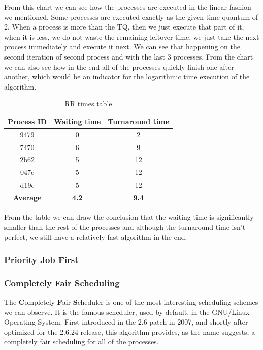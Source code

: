 \documentclass{article}
\begin{document}
From this chart we can see how the processes are executed in the linear fashion we mentioned. Some processes are executed exactly as the given time quantum of 2. When a process is more than the TQ, then we just execute that part of it, when it is less, we do not waste the remaining leftover time, we just take the next process immediately and execute it next. We can see that happening on the second iteration of second process and with the last 3 processes. From the chart we can also see how in the end all of the processes quickly finish one after another, which would be an indicator for the logarithmic time execution of the algorithm.

\begin{table}[H]
  \begin{center}
    \label{tab:RR times}
    \begin{tabular}{c|c|c}
      \toprule
      \textbf{Process ID} & \textbf{Waiting time} & \textbf{Turnaround time} \\
      \midrule
      9479 & 0 & 2 \\
      7470 & 6 & 9 \\
      2b62 & 5 & 12 \\
      047c & 5 & 12 \\
      d19c & 5 & 12 \\
      \bottomrule
      \toprule
      \textbf{Average} & \textbf{4.2} & \textbf{9.4} \\
    \end{tabular}
    \caption{RR times table}
  \end{center}
\end{table}

From the table we can draw the conclusion that the waiting time is significantly smaller than the rest of the processes and although the turnaround time isn't perfect, we still have a relatively fast algorithm in the end.

\subsubsection{\underline{Priority Job First}}

\subsubsection{\underline{Completely Fair Scheduling}}

The \textbf{C}ompletely \textbf{F}air \textbf{S}cheduler is one of the most interesting scheduling schemes we can observe. It is the famous scheduler, used by default, in the GNU/Linux Operating System. First introduced in the 2.6 patch in 2007, and shortly after optimized for the 2.6.24 release, this algorithm provides, as the name suggests, a completely fair scheduling for all of the processes.
\end{document}
